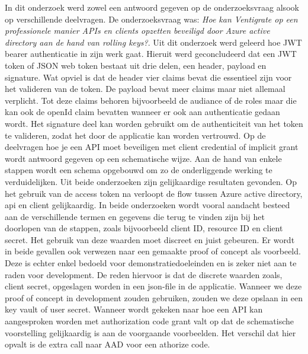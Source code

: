 In dit onderzoek werd zowel een antwoord gegeven op de onderzoeksvraag alsook op verschillende deelvragen. De onderzoeksvraag was: \emph{Hoe kan Ventigrate op een professionele manier APIs en clients opzetten beveiligd door Azure active directory aan de hand van rolling keys?}. \newline \newline 
Uit dit onderzoek werd geleerd hoe JWT bearer authenticatie in zijn werk gaat. Hieruit werd geconcludeerd dat een JWT token of JSON web token bestaat uit drie delen, een header, payload en signature. Wat opviel is dat de header vier claims bevat die essentieel zijn voor het valideren van de token. De payload bevat meer claims maar niet allemaal verplicht. Tot deze claims behoren bijvoorbeeld de audiance of de roles maar die kan ook de openId claim bevatten wanneer er ook aan authenticatie gedaan wordt. Het signature deel kan worden gebruikt om de authenticiteit van het token te valideren, zodat het door de applicatie kan worden vertrouwd. \newline \newline
Op de deelvragen hoe je een API moet beveiligen met client credential of implicit grant wordt antwoord gegeven op een schematische wijze. Aan de hand van enkele stappen wordt een schema opgebouwd om zo de onderliggende werking te verduidelijken. Uit beide onderzoeken zijn gelijkaardige resultaten gevonden. Op het gebruik van de access token na verloopt de flow tussen Azure active directory, api en client gelijkaardig. In beide onderzoeken wordt vooral aandacht besteed aan de verschillende termen en gegevens die terug te vinden zijn bij het doorlopen van de stappen, zoals bijvoorbeeld client ID, resource ID en client secret. Het gebruik van deze waarden moet discreet en juist gebeuren. Er wordt in beide gevallen ook verwezen naar een gemaakte proof of concept als voorbeeld. Deze is echter enkel bedoeld voor demonstratiedoeleinden en is zeker niet aan te raden voor development. De reden hiervoor is dat de discrete waarden zoals, client secret, opgeslagen worden in een json-file in de applicatie. Wanneer we deze proof of concept in development zouden gebruiken, zouden we deze opslaan in een key vault of user secret.\newline\newline
Wanneer wordt gekeken naar hoe een API kan aangesproken worden met authorization code grant valt op dat de schematische voorstelling gelijkaardig is aan de voorgaande voorbeelden. Het verschil dat hier opvalt is de extra call naar AAD voor een athorize code.\newline\newline
